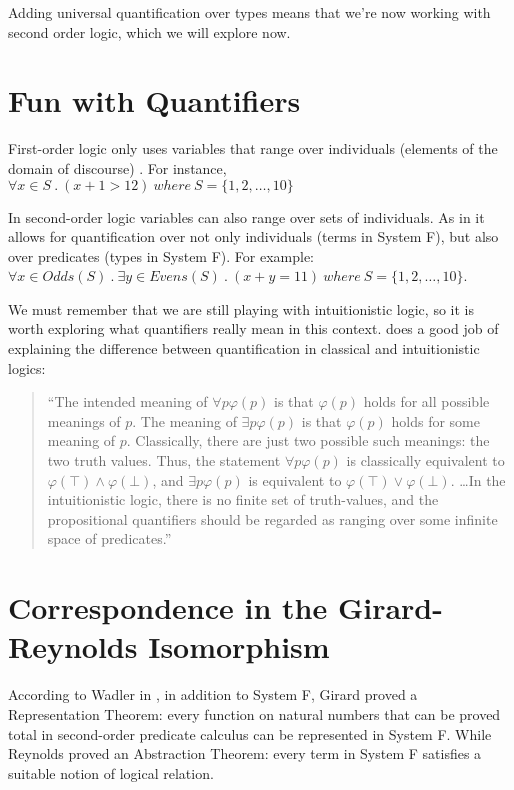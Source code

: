 Adding universal quantification over types means that we're now working with second order logic, which we will explore now.

\section{Fun with Quantifiers}
First-order logic only uses variables that range over individuals (elements of the domain of discourse) \cite{secondOrderWiki}. For instance, $\forall x \in S\ .\ (x+1 > 12)\ where\ S = \{1,2, \ldots, 10\}$

In second-order logic variables can also range over sets of individuals. As in it allows for quantification over not only individuals (terms in System F), but also over predicates (types in System F). For example: $\forall x \in Odds(S)\ .\ \exists y \in Evens(S)\ .\ (x+y = 11)\ where\ S = \{1,2, \ldots, 10\}$.

We must remember that we are still playing with intuitionistic logic, so it is worth exploring what quantifiers really mean in this context.  %
\cite{CHnotes} does a good job of explaining the difference between quantification in classical and intuitionistic logics:
\begin{quote}
``The intended meaning of $\forall p \varphi(p)$ is that $\varphi(p) $ holds for all possible meanings of $p $. The meaning of $\exists p \varphi(p)$ is that $\varphi(p) $ holds for some meaning of $p $. Classically, there are just two possible such meanings: the two truth values. Thus, the statement $\forall p \varphi(p) $ is classically equivalent to $\varphi(\top) \wedge \varphi(\bot)$, and $\exists p \varphi(p) $ is equivalent to $\varphi(\top) \vee \varphi(\bot)$. \ldots In the intuitionistic logic, there is no finite set of truth-values, and the propositional quantifiers should be regarded as ranging over some infinite space of predicates.''
\end{quote}

\section{Correspondence in the Girard-Reynolds Isomorphism}
According to Wadler in \cite{Wadlergirard}, in addition to System F, Girard proved a Representation Theorem: every function on natural numbers that can be proved total in second-order predicate calculus can be represented in System F. While Reynolds proved an Abstraction Theorem: every term in System F satisfies a suitable notion of logical relation.

